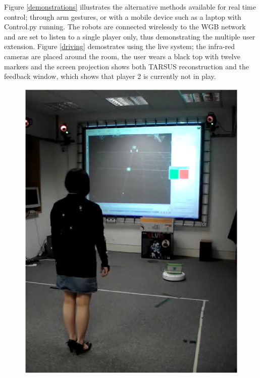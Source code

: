 \documentclass[12pt,a4,notitlepage]{report}
\renewcommand{\_}{\texttt{\symbol{95}}}
\newcommand{\<}{\texttt{\symbol{60}}}
\renewcommand{\>}{\texttt{\symbol{62}}}
\begin{document}
Figure \ref{demonstrations} illustrates the alternative methods available for real time control; through arm gestures, or with a mobile device such as a laptop with Control.py running. The robots are connected wirelessly to the WGB network and are set to listen to a single player only, thus demonstrating the multiple user extension. Figure \ref{driving} demostrates using the live system; the infra-red cameras are placed around the room, the user wears a black top with twelve markers and the screen projection shows both TARSUS reconstruction and the feedback window, which shows that player 2 is currently not in play.
\begin{figure}
\centering
\includegraphics[scale=0.15,angle=0]{images/live1.ps}

\end{figure}
\end{document}
